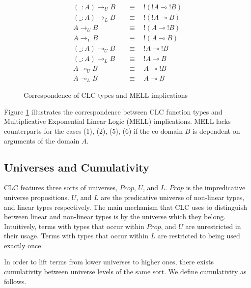 \documentclass{article}
\theoremstyle{definition}
\begin{document}
  \begin{figure}[H]
    \caption{Correspondence of CLC types and MELL implications}
    \begin{align}
      (\_ : A) \rightarrow_U B \quad &\equiv \quad !(!A \multimap !B) \\
      (\_ : A) \rightarrow_L B \quad &\equiv \quad !(!A \multimap B) \\
      A \rightarrow_U B \quad &\equiv \quad !(A \multimap !B) \\
      A \rightarrow_L B \quad &\equiv \quad !(A \multimap B) \\
      (\_ : A) \multimap_U B \quad &\equiv \quad !A \multimap !B \\
      (\_ : A) \multimap_L B \quad &\equiv \quad !A \multimap B \\
      A \multimap_U B \quad &\equiv \quad A \multimap !B \\
      A \multimap_L B \quad &\equiv \quad A \multimap B
    \end{align}
    \label{correspondence}
  \end{figure}
  Figure \ref{correspondence} illustrates the correspondence between CLC function types and Multiplicative Exponential Linear Logic (MELL) implications. MELL lacks counterparts for the cases (1), (2), (5), (6) if the co-domain $B$ is dependent on arguments of the domain $A$. 

  \subsection{Universes and Cumulativity}
  CLC features three sorts of universes, $Prop$, $U$, and $L$. $Prop$ is the impredicative universe propositions. $U$, and $L$ are the predicative universe of non-linear types, and linear types respectively. The main mechanism that CLC uses to distinguish between linear and non-linear types is by the universe which they belong. Intuitively, terms with types that occur within $Prop$, and $U$ are unrestricted in their usage. Terms with types that occur within $L$ are restricted to being used exactly once.

  In order to lift terms from lower universes to higher ones, there exists cumulativity between universe levels of the same sort. We define cumulativity as follows.
\end{document}
